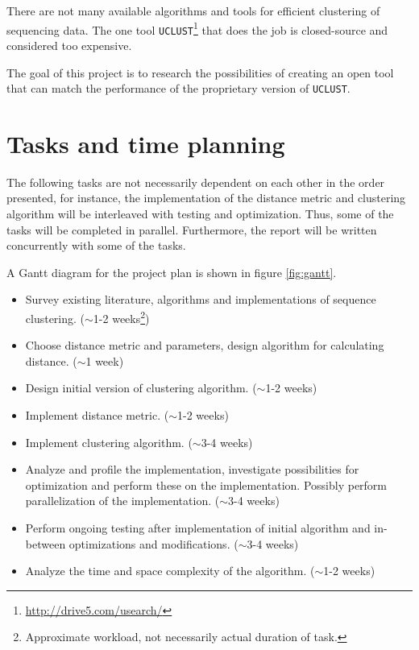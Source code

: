 \documentclass[11pt,a4paper]{article}
\begin{document}
There are not many available algorithms and tools for efficient clustering of
sequencing data. The one tool
\texttt{UCLUST}\footnote{\url{http://drive5.com/usearch/}} that does the job is
closed-source and considered too expensive.

The goal of this project is to research the possibilities of creating an open
tool that can match the performance of the proprietary version of
\texttt{UCLUST}.


\section{Tasks and time planning}
The following tasks are not necessarily dependent on each other in the order
presented, for instance, the implementation of the distance metric and
clustering algorithm will be interleaved with testing and optimization.
Thus, some of the tasks will be completed in parallel. Furthermore, the report
will be written concurrently with some of the tasks.

A Gantt diagram for the project plan is shown in figure \ref{fig:gantt}.

\begin{itemize}
  \item Survey existing literature, algorithms and implementations of sequence
    clustering. ($\sim$1-2 weeks\footnote{Approximate workload, not necessarily
    actual duration of task.})

  \item Choose distance metric and parameters, design algorithm for calculating
    distance. ($\sim$1 week)

  \item Design initial version of clustering algorithm. ($\sim$1-2 weeks)

  \item Implement distance metric. ($\sim$1-2 weeks)

  \item Implement clustering algorithm. ($\sim$3-4 weeks)

  \item Analyze and profile the implementation, investigate possibilities for
    optimization and perform these on the implementation. Possibly perform
    parallelization of the implementation. ($\sim$3-4 weeks)

  \item Perform ongoing testing after implementation of initial algorithm and
    in-between optimizations and modifications. ($\sim$3-4 weeks)

  \item Analyze the time and space complexity of the algorithm. ($\sim$1-2
    weeks)
\end{itemize}
\end{document}
